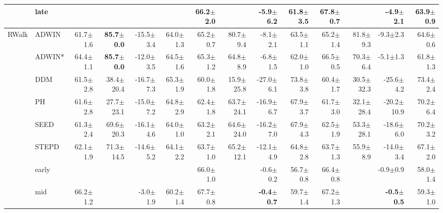 \begin{tabular}{llrrrrrrrrrrrr}
 & late &  &  &  &  & 66.2\tiny{$\pm$2.0} &  & -5.9\tiny{$\pm$6.2} & 61.8\tiny{$\pm$3.5} & 67.8\tiny{$\pm$0.7} &  & -4.9\tiny{$\pm$2.1} & 63.9\tiny{$\pm$0.9} \\
\midrule
\multirow[t]{9}{*}{RWalk} & ADWIN & 61.7\tiny{$\pm$1.6} & \textbf{85.7\tiny{$\pm$0.0}} & -15.5\tiny{$\pm$3.4} & 64.0\tiny{$\pm$1.3} & 65.2\tiny{$\pm$0.7} & 80.7\tiny{$\pm$9.4} & -8.1\tiny{$\pm$2.1} & 63.5\tiny{$\pm$1.1} & 65.2\tiny{$\pm$1.4} & 81.8\tiny{$\pm$9.3} & -9.3\tiny{$\pm$2.3} & 64.6\tiny{$\pm$0.6} \\
 & ADWIN* & 64.4\tiny{$\pm$1.1} & \textbf{85.7\tiny{$\pm$0.0}} & -12.0\tiny{$\pm$3.5} & 64.5\tiny{$\pm$1.6} & 65.3\tiny{$\pm$1.2} & 64.8\tiny{$\pm$8.9} & -6.8\tiny{$\pm$1.5} & 62.0\tiny{$\pm$1.0} & 66.5\tiny{$\pm$0.5} & 70.3\tiny{$\pm$6.4} & -5.1\tiny{$\pm$1.3} & 61.8\tiny{$\pm$1.3} \\
 & DDM & 61.5\tiny{$\pm$2.8} & 38.4\tiny{$\pm$20.4} & -16.7\tiny{$\pm$7.3} & 65.3\tiny{$\pm$1.9} & 60.0\tiny{$\pm$1.8} & 15.9\tiny{$\pm$25.8} & -27.0\tiny{$\pm$6.1} & 73.8\tiny{$\pm$3.8} & 60.4\tiny{$\pm$1.7} & 30.5\tiny{$\pm$32.3} & -25.6\tiny{$\pm$4.2} & 73.4\tiny{$\pm$2.4} \\
 & PH & 61.6\tiny{$\pm$2.8} & 27.7\tiny{$\pm$23.1} & -15.0\tiny{$\pm$7.2} & 64.8\tiny{$\pm$2.9} & 62.4\tiny{$\pm$1.8} & 63.7\tiny{$\pm$24.1} & -16.9\tiny{$\pm$6.7} & 67.9\tiny{$\pm$3.7} & 61.7\tiny{$\pm$3.0} & 32.1\tiny{$\pm$28.4} & -20.2\tiny{$\pm$10.9} & 70.2\tiny{$\pm$6.4} \\
 & SEED & 61.3\tiny{$\pm$2.4} & 69.6\tiny{$\pm$20.3} & -16.1\tiny{$\pm$4.6} & 64.0\tiny{$\pm$1.0} & 63.2\tiny{$\pm$2.1} & 64.6\tiny{$\pm$24.0} & -16.2\tiny{$\pm$7.0} & 67.9\tiny{$\pm$4.3} & 62.5\tiny{$\pm$1.9} & 53.3\tiny{$\pm$28.1} & -18.6\tiny{$\pm$6.0} & 70.2\tiny{$\pm$3.2} \\
 & STEPD & 62.1\tiny{$\pm$1.9} & 71.3\tiny{$\pm$14.5} & -14.6\tiny{$\pm$5.2} & 64.1\tiny{$\pm$2.2} & 63.7\tiny{$\pm$1.0} & 65.2\tiny{$\pm$12.1} & -12.1\tiny{$\pm$4.9} & 64.8\tiny{$\pm$2.8} & 63.7\tiny{$\pm$1.3} & 55.9\tiny{$\pm$8.9} & -14.0\tiny{$\pm$3.4} & 67.1\tiny{$\pm$2.0} \\
 & early &  &  &  &  & 66.0\tiny{$\pm$1.0} &  & -0.6\tiny{$\pm$0.2} & 56.7\tiny{$\pm$0.8} & 66.4\tiny{$\pm$0.8} &  & -0.9\tiny{$\pm$0.9} & 58.0\tiny{$\pm$1.4} \\
 & mid & 66.2\tiny{$\pm$1.2} &  & -3.0\tiny{$\pm$1.9} & 60.2\tiny{$\pm$1.4} & 67.7\tiny{$\pm$0.8} &  & \textbf{-0.4\tiny{$\pm$0.7}} & 59.7\tiny{$\pm$1.4} & 67.2\tiny{$\pm$1.3} &  & \textbf{-0.5\tiny{$\pm$0.5}} & 59.3\tiny{$\pm$1.0} \\

\end{tabular}

